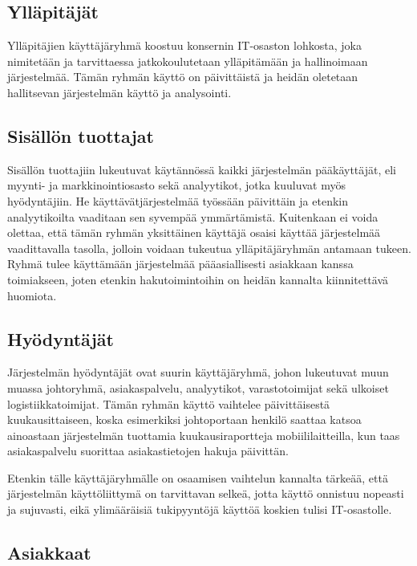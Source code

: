     \subsection*{Ylläpitäjät}

        Ylläpitäjien käyttäjäryhmä koostuu konsernin IT-osaston lohkosta, joka nimitetään ja tarvittaessa jatkokoulutetaan ylläpitämään ja hallinoimaan 
        järjestelmää. Tämän ryhmän käyttö on päivittäistä ja heidän oletetaan hallitsevan järjestelmän käyttö ja analysointi.

    \subsection*{Sisällön tuottajat}

        Sisällön tuottajiin lukeutuvat käytännössä kaikki järjestelmän pääkäyttäjät, eli myynti- ja markkinointiosasto sekä analyytikot, jotka kuuluvat 
        myös hyödyntäjiin. He käyttävätjärjestelmää työssään päivittäin ja etenkin analyytikoilta vaaditaan sen syvempää ymmärtämistä. Kuitenkaan ei
        voida olettaa, että tämän ryhmän yksittäinen käyttäjä osaisi käyttää järjestelmää vaadittavalla tasolla, jolloin voidaan tukeutua 
        ylläpitäjäryhmän antamaan tukeen. Ryhmä tulee käyttämään järjestelmää pääasiallisesti asiakkaan kanssa toimiakseen, joten etenkin hakutoimintoihin on heidän kannalta kiinnitettävä
        huomiota.

    \subsection*{Hyödyntäjät}

        Järjestelmän hyödyntäjät ovat suurin käyttäjäryhmä, johon lukeutuvat muun muassa johtoryhmä, asiakaspalvelu, analyytikot, varastotoimijat sekä 
        ulkoiset logistiikkatoimijat. Tämän ryhmän käyttö vaihtelee päivittäisestä kuukausittaiseen, koska esimerkiksi johtoportaan henkilö saattaa katsoa 
        ainoastaan järjestelmän tuottamia kuukausiraportteja mobiililaitteilla, kun taas asiakaspalvelu suorittaa asiakastietojen hakuja päivittän.

        Etenkin tälle käyttäjäryhmälle on osaamisen vaihtelun kannalta tärkeää, että järjestelmän käyttöliittymä on tarvittavan selkeä, jotta 
        käyttö onnistuu nopeasti ja sujuvasti, eikä ylimääräisiä tukipyyntöjä käyttöä koskien tulisi IT-osastolle.

    \subsection*{Asiakkaat}

